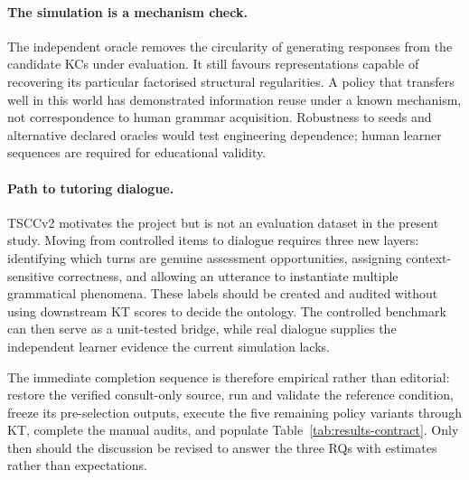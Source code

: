 \paragraph{The simulation is a mechanism check.}
The independent oracle removes the circularity of generating responses from
the candidate KCs under evaluation.  It still favours representations capable
of recovering its particular factorised structural regularities.  A policy
that transfers well in this world has demonstrated information reuse under a
known mechanism, not correspondence to human grammar acquisition.  Robustness
to seeds and alternative declared oracles would test engineering dependence;
human learner sequences are required for educational validity.

\paragraph{Path to tutoring dialogue.}
TSCCv2 motivates the project but is not an evaluation dataset in the present
study.  Moving from controlled items to dialogue requires three new layers:
identifying which turns are genuine assessment opportunities, assigning
context-sensitive correctness, and allowing an utterance to instantiate
multiple grammatical phenomena.  These labels should be created and audited
without using downstream KT scores to decide the ontology.  The controlled
benchmark can then serve as a unit-tested bridge, while real dialogue supplies
the independent learner evidence the current simulation lacks.

The immediate completion sequence is therefore empirical rather than
editorial: restore the verified consult-only source, run and validate the
reference condition, freeze its pre-selection outputs, execute the five
remaining policy variants through KT, complete the manual audits, and populate
Table~\ref{tab:results-contract}.  Only then should the discussion be revised
to answer the three RQs with estimates rather than expectations.
